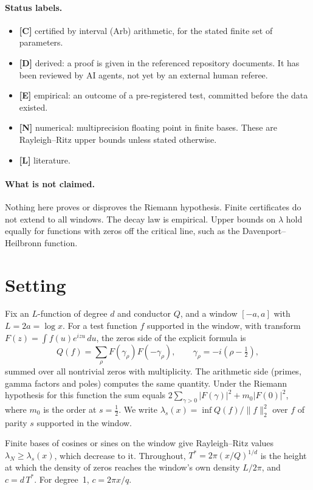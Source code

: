 \documentclass[11pt]{article}
\theoremstyle{remark}
\newcommand{\tagC}{\textbf{[C]}}
\newcommand{\tagD}{\textbf{[D]}}
\newcommand{\tagE}{\textbf{[E]}}
\newcommand{\tagN}{\textbf{[N]}}
\newcommand{\tagL}{\textbf{[L]}}
\begin{document}
\paragraph{Status labels.}
\begin{itemize}
\item \tagC{} certified by interval (Arb) arithmetic, for the stated finite set of parameters.
\item \tagD{} derived: a proof is given in the referenced repository documents. It has been reviewed by AI agents, not yet by an external human referee.
\item \tagE{} empirical: an outcome of a pre-registered test, committed before the data existed.
\item \tagN{} numerical: multiprecision floating point in finite bases. These are Rayleigh--Ritz upper bounds unless stated otherwise.
\item \tagL{} literature.
\end{itemize}

\paragraph{What is not claimed.} Nothing here proves or disproves the Riemann hypothesis. Finite certificates do not extend to all windows. The decay law is empirical. Upper bounds on $\lambda$ hold equally for functions with zeros off the critical line, such as the Davenport--Heilbronn function.

\section{Setting}
Fix an $L$-function of degree $d$ and conductor $Q$, and a window $[-a,a]$ with $L=2a=\log x$. For a test function $f$ supported in the window, with transform $F(z)=\int f(u)e^{izu}\,du$, the zeros side of the explicit formula is
\[
Q(f)=\sum_\rho F(\gamma_\rho)F(-\gamma_\rho),\qquad \gamma_\rho=-i(\rho-\tfrac12),
\]
summed over all nontrivial zeros with multiplicity. The arithmetic side (primes, gamma factors and poles) computes the same quantity. Under the Riemann hypothesis for this function the sum equals $2\sum_{\gamma>0}|F(\gamma)|^2+m_0|F(0)|^2$, where $m_0$ is the order at $s=\tfrac12$. We write $\lambda_s(x)=\inf Q(f)/\|f\|_2^2$ over $f$ of parity $s$ supported in the window.

Finite bases of cosines or sines on the window give Rayleigh--Ritz values $\lambda_N\ge\lambda_s(x)$, which decrease to it. Throughout, $T^*=2\pi(x/Q)^{1/d}$ is the height at which the density of zeros reaches the window's own density $L/2\pi$, and $c=d\,T^*$. For degree~1, $c=2\pi x/q$.
\end{document}
